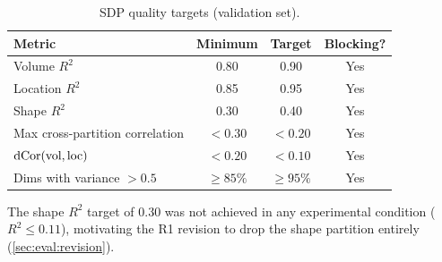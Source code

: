 \begin{table}[H]
  \centering
  \caption{SDP quality targets (validation set).}
  \label{tab:sdp_targets}
  \begin{tabular}{lccc}
    \toprule
    \textbf{Metric} & \textbf{Minimum} & \textbf{Target} & \textbf{Blocking?} \\
    \midrule
    Volume $R^2$ & 0.80 & 0.90 & Yes \\
    Location $R^2$ & 0.85 & 0.95 & Yes \\
    Shape $R^2$ & 0.30 & 0.40 & Yes \\
    Max cross-partition correlation & $< 0.30$ & $< 0.20$ & Yes \\
    $\operatorname{dCor}(\text{vol}, \text{loc})$ & $< 0.20$ & $< 0.10$ & Yes \\
    Dims with variance $> 0.5$ & $\geq 85\%$ & $\geq 95\%$ & Yes \\
    \bottomrule
  \end{tabular}
\end{table}

\begin{remark}
  The shape $R^2$ target of 0.30 was not achieved in any experimental
  condition ($R^2 \leq 0.11$), motivating the R1 revision to drop the shape
  partition entirely (\cref{sec:eval:revision}).
\end{remark}
